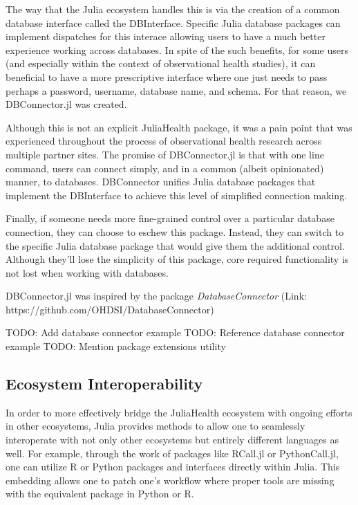 \documentclass{juliacon}
\begin{document}
The way that the Julia ecosystem handles this is via the creation of a common database interface called the DBInterface.
Specific Julia database packages can implement dispatches for this interace allowing users to have a much better experience working across databases.
In spite of the such benefits, for some users (and especially within the context of observational health studies), it can beneficial to have a more prescriptive interface where one just needs to pass perhaps a password, username, database name, and schema.
For that reason, we DBConnector.jl was created.

Although this is not an explicit JuliaHealth package, it was a pain point that was experienced throughout the process of observational health research across multiple partner sites.
The promise of DBConnector.jl is that with one line command, users can connect simply, and in a common (albeit opinionated) manner, to databases.
DBConnector unifies Julia database packages that implement the DBInterface to achieve this level of simplified connection making.

Finally, if someone needs more fine-grained control over a particular database connection, they can choose to eschew this package.
Instead, they can switch to the specific Julia database package that would give them the additional control.
Although they'll lose the simplicity of this package, core required functionality is not lost when working with databases.

DBConnector.jl was inspired by the package \textit{DatabaseConnector} (Link: https://github.com/OHDSI/DatabaseConnector)

TODO: Add database connector example
TODO: Reference database connector example
TODO: Mention package extensions utility

\subsection{Ecosystem Interoperability}

In order to more effectively bridge the JuliaHealth ecosystem with ongoing efforts in other ecosystems, Julia provides methods to allow one to seamlessly interoperate with not only other ecosystems but entirely different languages as well.
For example, through the work of packages like RCall.jl or PythonCall.jl, one can utilize R or Python packages and interfaces directly within Julia. \cite{PythonCall.jl} \cite{RCallJl}
This embedding allows one to patch one's workflow where proper tools are missing with the equivalent package in Python or R.
\end{document}
